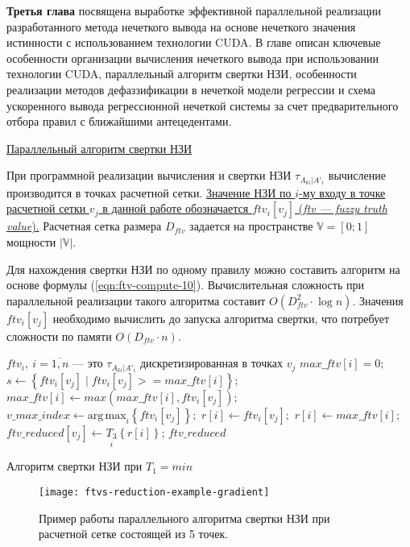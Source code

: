 \textbf{Третья глава} посвящена выработке эффективной параллельной реализации разработанного метода нечеткого вывода на основе нечеткого значения истинности с использованием технологии CUDA. В главе описан ключевые особенности организации вычисления нечеткого вывода при использовании технологии CUDA, параллельный алгоритм свертки НЗИ, особенности реализации методов дефаззификации в нечеткой модели регрессии и схема ускоренного вывода регрессионной нечеткой системы за счет предварительного отбора правил с ближайшими антецедентами.

\ul{Параллельный алгоритм свертки НЗИ}

При программной реализации вычисления и свертки НЗИ $\tau_{A_{ki}|A'_i}$ вычисление производится в точках расчетной сетки. \ul{Значение НЗИ по $i$-му входу в точке расчетной сетки $v_j$ в данной работе обозначается $ftv_i[v_j]$ (\textit{ftv --- fuzzy truth value}).} Расчетная сетка размера $D_{ftv}$ задается на пространстве $\mathbb{V}=[0;1]$ мощности $|\mathbb{V}|$.

Для нахождения свертки НЗИ по одному правилу можно составить алгоритм на основе формулы (\ref{eqn:ftv-compute-10}). Вычислительная сложность при параллельной реализации такого алгоритма составит $O\left(D_{ftv}^2 \cdot \log{n}\right)$. Значения $ftv_i[v_j]$ необходимо вычислить до запуска алгоритма свертки, что потребует сложности по памяти $O\left(D_{ftv}\cdot n\right)$.

\begin{algorithm}
	\begin{algorithmic}
		\Require $ftv_i,\ i=\overline{1,n}$ --- это $\tau_{A_{ki}|A'_i}$ дискретизированная в точках $v_j$
		\State $max\_ftv[i] = 0;$
		\State $s \gets \left\{ftv_i[v_j] \mid ftv_i[v_j] >= max\_ftv[i]\right\};$
		\State $max\_ftv[i] \gets max(max\_ftv[i], ftv_i[v_j]);$
		\State $v\_max\_index \gets \mathrm{arg\,max}_i\left\{ftv_i[v_j]\right\};$
		\State $r[i] \gets ftv_{i}[v_j];$
		\Else
		\State $r[i] \gets max\_ftv[i];$
		\EndIf
		\State $ftv\_reduced[v_j] \gets \underset{i}{T_3}\left\{r[i]\right\}$;
		\EndFor
		\State \Return $ftv\_reduced$
	\end{algorithmic}
	\caption{Алгоритм свертки НЗИ при $T_1=min$}
	\label{alg:ftv-reduction}
\end{algorithm}

\begin{figure}[ht]
	\centering
	\texttt{[image: ftvs-reduction-example-gradient]}
	\caption{Пример работы параллельного алгоритма свертки НЗИ при расчетной сетке состоящей из 5 точек.}
	\label{fig:ftvs-reduction-example}
\end{figure}

